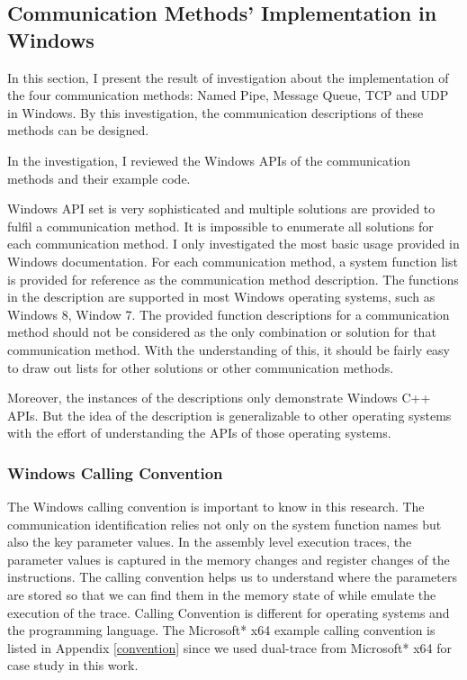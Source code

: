 \subsection{Communication Methods' Implementation in Windows}\label{windows}
In this section, I present the result of investigation about the implementation of the four communication methods: Named Pipe, Message Queue, TCP and UDP in Windows. By this investigation, the communication descriptions of these methods can be designed.

In the investigation, I reviewed the Windows APIs of the communication methods and their example code. 

Windows API set is very sophisticated and multiple solutions are provided to fulfil a communication method. It is impossible to enumerate all solutions for each communication method. I only investigated the most basic usage provided in Windows documentation. For each communication method, a system function list is provided for reference as the communication method description. The functions in the description are supported in most Windows operating systems, such as Windows 8, Window 7. The provided function descriptions for a communication method should not be considered as the only combination or solution for that communication method. With the understanding of this, it should be fairly easy to draw out lists for other solutions or other communication methods. 

Moreover, the instances of the descriptions only demonstrate Windows C++ APIs. But the idea of the description is generalizable to other operating systems with the effort of understanding the APIs of those operating systems.

\subsubsection{Windows Calling Convention}
The Windows calling convention is important to know in this research. The communication identification relies not only on the system function names but also the key parameter values. In the assembly level execution traces, the parameter values is captured in the memory changes and register changes of the instructions. The calling convention helps us to understand where the parameters are stored so that we can find them in the memory state of while emulate the execution of the trace. Calling Convention is different for operating systems and the programming language. The Microsoft* x64 example calling convention is listed in Appendix \ref{convention} since we used dual-trace from Microsoft* x64 for case study in this work.


